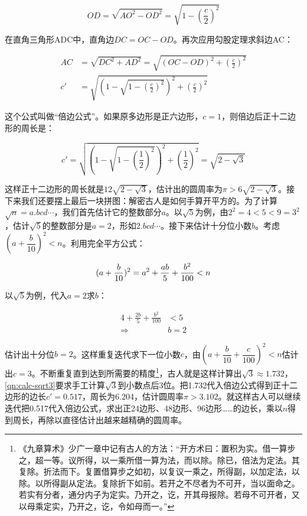 \documentclass[b5paper]{ctexart}
\begin{document}
\[
OD = \sqrt{AO^2 - OD^2} = \sqrt{1 - \left(\frac{c}{2}\right)^2}
\]

在直角三角形ADC中，直角边$DC = OC - OD$。再次应用勾股定理求斜边AC：

\begin{align}
AC &= \sqrt{DC^2 + AD^2} = \sqrt{(OC - OD)^2 + \left(\frac{c}{2}\right)^2}  \\
c' &= \sqrt{\left(1 - \sqrt{1 - \left(\frac{c}{2}\right)^2}\right)^2 + \left(\frac{c}{2}\right)^2}
\label{eq:double-edges}
\end{align}

这个公式叫做“倍边公式”。如果原多边形是正六边形，$c = 1$，则倍边后正十二边形的周长是：

\[
c' = \sqrt{\left(1 - \sqrt{1 - \left(\frac{1}{2}\right)^2}\right)^2 + \left(\frac{1}{2}\right)^2} = \sqrt{2 - \sqrt{3}}
\]

这样正十二边形的周长就是$12\sqrt{2 - \sqrt{3}}$，估计出的圆周率为$\pi > 6\sqrt{2 - \sqrt{3}}$。接下来我们还要摆上最后一块拼图：解密古人是如何手算开平方的。为了计算$\sqrt{n} = a.bcd\dotsm$，我们首先估计它的整数部分$a$。以$\sqrt{5}$为例，由$2^2 = 4 < 5 < 9 = 3^2$，估计$\sqrt{5}$的整数部分是$a = 2$，形如$2.bcd\dotsm$。接下来估计十分位小数$b$。考虑$(a + \dfrac{b}{10})^2 < n$。利用完全平方公式：

\[
(a + \frac{b}{10})^2 = a^2 + \frac{ab}{5} + \frac{b^2}{100}  < n \\
\]

以$\sqrt{5}$为例，代入$a = 2$求$b$：

\begin{align*}
4 + \frac{2b}{5} + \frac{b^2}{100} &< 5 \\
 \Rightarrow & b = 2
\end{align*}

估计出十分位$b = 2$。这样重复迭代求下一位小数$c$，由$(a + \dfrac{b}{10} + \dfrac{c}{100})^2 < n$估计出$c = 3$。不断重复直到达到所需要的精度\footnote{《九章算术》少广一章中记有古人的方法：“开方术曰：置积为实。借一算步之，超一等。议所得，以一乘所借一算为法，而以除。除已，倍法为定法。其复除。折法而下。复置借算步之如初，以复议一乘之，所得副，以加定法，以除。以所得副从定法。复除折下如前。若开之不尽者为不可开，当以面命之。若实有分者，通分内子为定实。乃开之，讫，开其母报除。若母不可开者，又以母乘定实，乃开之，讫，令如母而一。”}，古人就是这样计算出$\sqrt{3} \approx 1.732$，\cref{qn:calc-sqrt3}要求手工计算$\sqrt{3}$到小数点后3位。把1.732代入倍边公式得到正十二边形的边长$c' = 0.517$，周长为6.204，估计圆周率$\pi > 3.102$。就这样古人可以继续迭代把0.517代入倍边公式，求出正24边形、48边形、96边形……的边长，乘以$n$得到周长，再除以直径估计出越来越精确的圆周率。
\end{document}
